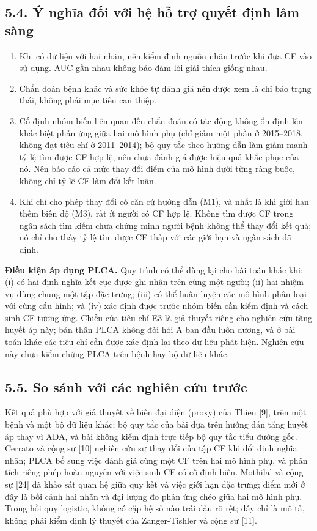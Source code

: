 \documentclass[9pt,a4paper]{extarticle}
\providecommand{\tightlist}{\setlength{\itemsep}{0pt}\setlength{\parskip}{0pt}}
\begin{document}
\subsection{5.4. Ý nghĩa đối với hệ hỗ trợ quyết định lâm sàng}

\begin{enumerate}
\def\labelenumi{\arabic{enumi}.}
\tightlist
\item
  Khi có dữ liệu với hai nhãn, nên kiểm định nguồn nhãn trước khi đưa CF
  vào sử dụng. AUC gần nhau không bảo đảm lời giải thích giống nhau.
\item
  Chẩn đoán bệnh khác và sức khỏe tự đánh giá nên được xem là chỉ báo
  trạng thái, không phải mục tiêu can thiệp.
\item
  Cố định nhóm biến liên quan đến chẩn đoán có tác động không ổn định
  lên khác biệt phản ứng giữa hai mô hình phụ (chỉ giảm một phần ở
  2015--2018, không đạt tiêu chí ở 2011--2014); bộ quy tắc theo hướng
  dẫn làm giảm mạnh tỷ lệ tìm được CF hợp lệ, nên chưa đánh giá được
  hiệu quả khắc phục của nó. Nên báo cáo cả mức thay đổi điểm của mô
  hình dưới từng ràng buộc, không chỉ tỷ lệ CF làm đổi kết luận.
\item
  Khi chỉ cho phép thay đổi có căn cứ hướng dẫn (M1), và nhất là khi
  giới hạn thêm biên độ (M3), rất ít người có CF hợp lệ. Không tìm được
  CF trong ngân sách tìm kiếm chưa chứng minh người bệnh không thể thay
  đổi kết quả; nó chỉ cho thấy tỷ lệ tìm được CF thấp với các giới hạn
  và ngân sách đã định.
\end{enumerate}

\textbf{Điều kiện áp dụng PLCA.} Quy trình có thể dùng lại cho bài toán
khác khi: (i) có hai định nghĩa kết cục được ghi nhận trên cùng một
người; (ii) hai nhiệm vụ dùng chung một tập đặc trưng; (iii) có thể huấn
luyện các mô hình phân loại với cùng cấu hình; và (iv) xác định được
trước nhóm biến cần kiểm định và cách sinh CF tương ứng. Chiều của tiêu
chí E3 là giả thuyết riêng cho nghiên cứu tăng huyết áp này; bản thân
PLCA không đòi hỏi A ban đầu luôn dương, và ở bài toán khác các tiêu chí
cần được xác định lại theo dữ liệu phát hiện. Nghiên cứu này chưa kiểm
chứng PLCA trên bệnh hay bộ dữ liệu khác.

\subsection{5.5. So sánh với các nghiên cứu trước}

Kết quả phù hợp với giả thuyết về biến đại diện (proxy) của Thieu
{[}9{]}, trên một bệnh và một bộ dữ liệu khác; bộ quy tắc của bài dựa
trên hướng dẫn tăng huyết áp thay vì ADA, và bài không kiểm định trực
tiếp bộ quy tắc tiểu đường gốc. Cerrato và cộng sự {[}10{]} nghiên cứu
sự thay đổi của tập CF khi đổi định nghĩa nhãn; PLCA bổ sung việc đánh
giá cùng một CF trên hai mô hình phụ, và phân tích riêng phép hoàn
nguyên với việc sinh CF có cố định biến. Mothilal và cộng sự {[}24{]} đã
khảo sát quan hệ giữa quy kết và việc giới hạn đặc trưng; điểm mới ở đây
là bối cảnh hai nhãn và đại lượng đo phản ứng chéo giữa hai mô hình phụ.
Trong hồi quy logistic, không có cặp hệ số nào trái dấu rõ rệt; đây chỉ
là mô tả, không phải kiểm định lý thuyết của Zanger-Tishler và cộng sự
{[}11{]}.
\end{document}
